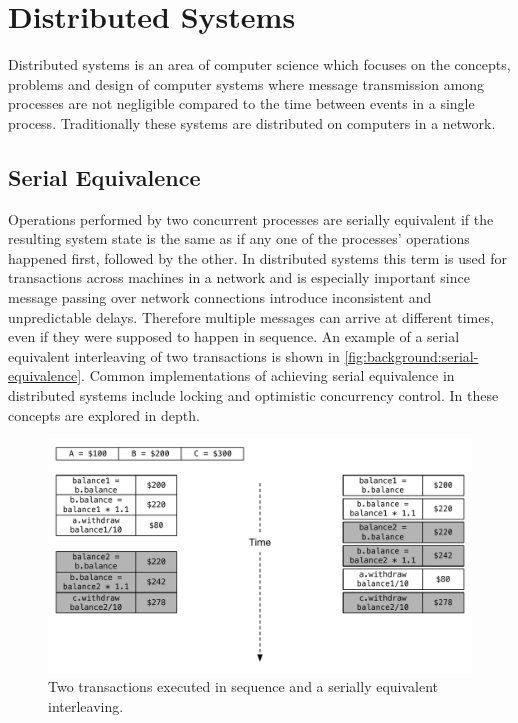 	\section{Distributed Systems}
		Distributed systems is an area of computer science which focuses on the concepts, problems and design of computer systems where message transmission among processes are not negligible compared to the time between events in a single process\cite{Lamport:1978:TCO:359545.359563}. Traditionally these systems are distributed on computers in a network.
		
		\subsection{Serial Equivalence}
		Operations performed by two concurrent processes are serially equivalent if the resulting system state is the same as if any one of the processes' operations happened first, followed by the other. In distributed systems this term is used for transactions across machines in a network and is especially important since message passing over network connections introduce inconsistent and unpredictable delays. Therefore multiple messages can arrive at different times, even if they were supposed to happen in sequence. An example of a serial equivalent interleaving of two transactions is shown in \autoref{fig:background:serial-equivalence}. Common implementations of achieving serial equivalence in distributed systems include locking and optimistic concurrency control. In \cite{Coulouris:2011:DSC:2029110:chapter16} these concepts are explored in depth.
		
		\begin{figure}[H]
		\centering
		\includegraphics[width=\textwidth]{2background/images/serial-equivalence.pdf}
		\caption{Two transactions executed in sequence and a serially equivalent interleaving.}
		\label{fig:background:serial-equivalence}
		\end{figure}
		

